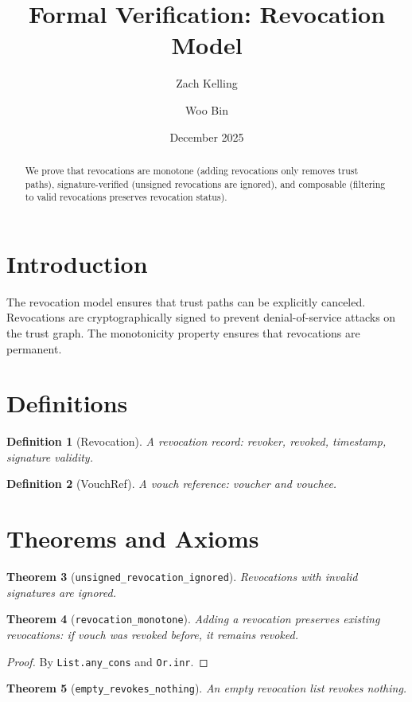 \documentclass[11pt]{article}
\title{Formal Verification: Revocation Model}
\author{Zach Kelling \and Woo Bin}
\date{December 2025}
\newtheorem{theorem}{Theorem}
\newtheorem{definition}[theorem]{Definition}
\begin{document}
\maketitle

\begin{abstract}
We prove that revocations are monotone (adding revocations only removes trust paths), signature-verified (unsigned revocations are ignored), and composable (filtering to valid revocations preserves revocation status).
\end{abstract}

\section{Introduction}
The revocation model ensures that trust paths can be explicitly canceled. Revocations are cryptographically signed to prevent denial-of-service attacks on the trust graph. The monotonicity property ensures that revocations are permanent.

\section{Definitions}
\begin{definition}[Revocation]
A revocation record: revoker, revoked, timestamp, signature validity.
\end{definition}

\begin{definition}[VouchRef]
A vouch reference: voucher and vouchee.
\end{definition}


\section{Theorems and Axioms}
\begin{theorem}[\texttt{unsigned\_revocation\_ignored}]
Revocations with invalid signatures are ignored.
\end{theorem}

\begin{theorem}[\texttt{revocation\_monotone}]
Adding a revocation preserves existing revocations: if vouch was revoked before, it remains revoked.
\end{theorem}
\begin{proof}
By \texttt{List.any\_cons} and \texttt{Or.inr}.
\end{proof}

\begin{theorem}[\texttt{empty\_revokes\_nothing}]
An empty revocation list revokes nothing.
\end{theorem}
\end{document}

